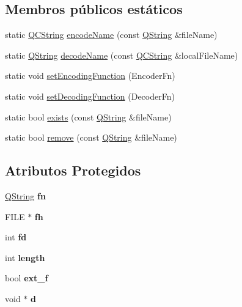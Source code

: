 \subsection*{Membros públicos estáticos}
\begin{DoxyCompactItemize}
\item 
static \hyperlink{class_q_c_string}{Q\-C\-String} \hyperlink{class_q_file_adfa158674153a85ab3c61ecfa9f87291}{encode\-Name} (const \hyperlink{class_q_string}{Q\-String} \&file\-Name)
\item 
static \hyperlink{class_q_string}{Q\-String} \hyperlink{class_q_file_a65debf483ca2c9d1991b35c7560708b3}{decode\-Name} (const \hyperlink{class_q_c_string}{Q\-C\-String} \&local\-File\-Name)
\item 
static void \hyperlink{class_q_file_a270daef97e4450e8b03bf1d2dbec6000}{set\-Encoding\-Function} (Encoder\-Fn)
\item 
static void \hyperlink{class_q_file_aceaad155d9845579b0db76d2bac96d29}{set\-Decoding\-Function} (Decoder\-Fn)
\item 
static bool \hyperlink{class_q_file_af9994df3c97b6221c570cc0fbb1dfc99}{exists} (const \hyperlink{class_q_string}{Q\-String} \&file\-Name)
\item 
static bool \hyperlink{class_q_file_a7b3d10374633a49bfa7e446c422c21f3}{remove} (const \hyperlink{class_q_string}{Q\-String} \&file\-Name)
\end{DoxyCompactItemize}
\subsection*{Atributos Protegidos}
\begin{DoxyCompactItemize}
\item 
\hypertarget{class_q_file_a42272ab7dc0ceb8d2bf8ec08dd3871cc}{\hyperlink{class_q_string}{Q\-String} {\bfseries fn}}\label{class_q_file_a42272ab7dc0ceb8d2bf8ec08dd3871cc}

\item 
\hypertarget{class_q_file_a77679c3e1b0f04ed2c76e00e41363351}{F\-I\-L\-E $\ast$ {\bfseries fh}}\label{class_q_file_a77679c3e1b0f04ed2c76e00e41363351}

\item 
\hypertarget{class_q_file_a6f8059414f0228f0256115e024eeed4b}{int {\bfseries fd}}\label{class_q_file_a6f8059414f0228f0256115e024eeed4b}

\item 
\hypertarget{class_q_file_a9f59b34b1f25fe00023291b678246bcc}{int {\bfseries length}}\label{class_q_file_a9f59b34b1f25fe00023291b678246bcc}

\item 
\hypertarget{class_q_file_a3cc28b766af96f20944211c133ec91d2}{bool {\bfseries ext\-\_\-f}}\label{class_q_file_a3cc28b766af96f20944211c133ec91d2}

\item 
\hypertarget{class_q_file_ac948f13dbf1ed6a8ad17f9b44a1343d1}{void $\ast$ {\bfseries d}}\label{class_q_file_ac948f13dbf1ed6a8ad17f9b44a1343d1}

\end{DoxyCompactItemize}
